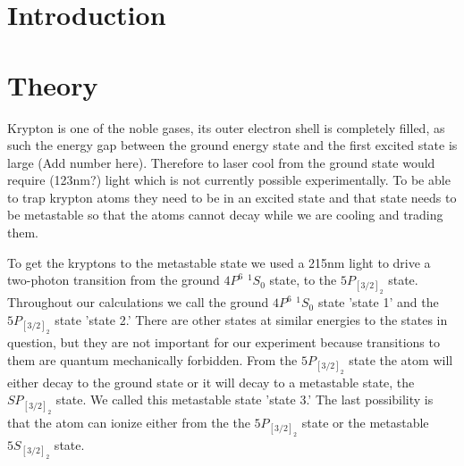 \documentclass[prb,preprint]{revtex4-1}
\begin{document}
\title{}


\author{Danika Luntz-Martin}

\author{William Williams}

\date{\today}

\begin{abstract}


\end{abstract}


\maketitle 


\section{Introduction} 


\section{Theory}

Krypton is one of the noble gases, its outer electron shell is completely filled, as such the energy gap between the ground energy state and the first excited state is large (Add number here). Therefore to laser cool from the ground state would require (123nm?) light which is not currently possible experimentally. To be able to trap krypton atoms they need to be in an excited state and that state needs to be metastable so that the atoms cannot decay while we are cooling and trading them. 

To get the kryptons to the metastable state we used a 215nm light to drive a two-photon transition from the ground $4P^6$ $^1S_0$ state, to the $5P_{[3/2]_2}$ state. Throughout our calculations we call the ground $4P^6$ $^1S_0$ state 'state 1' and the $5P_{[3/2]_2}$ state 'state 2.' There are other states at similar energies to the states in question, but they are not important for our experiment because transitions to them are quantum mechanically forbidden. From the $5P_{[3/2]_2}$ state the atom will either decay to the ground state or it will decay to a metastable state, the $SP_{[3/2]_2}$ state. We called this metastable state 'state 3.' The last possibility is that the atom can ionize either from the the $5P_{[3/2]_2}$ state or the metastable $5S_{[3/2]_2}$ state.
\end{document}
